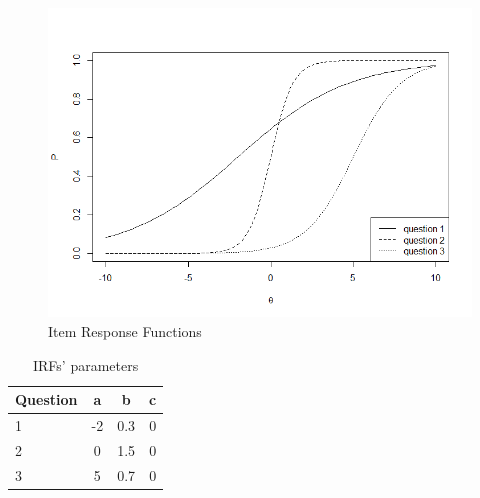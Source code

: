 \begin{figure}
\centering
  \includegraphics[width=0.8\columnwidth]{obr/irfs.png}%
  \caption{Item Response Functions}%
	\label{pic:IRFs}%
\end{figure}
\begin{table}%
\centering
	\begin{tabular}{lccc} \hline
		Question & a & b & c \\ \hline
		1 & -2 & 0.3 & 0\\
		2 & 0 & 1.5 & 0\\
		3 & 5 & 0.7 & 0\\
	\hline
  \end{tabular}
  \caption{IRFs' parameters}%
	\label{tab:IRFs}%
\end{table}
  


